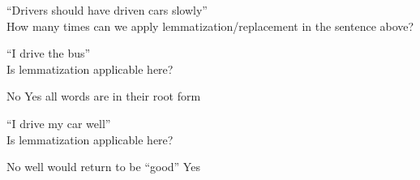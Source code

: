 \documentclass[theme=sleek, randomorder, hidesidemenu]{webquiz}
\begin{document}
\begin{question}
  ``Drivers should have driven cars slowly''\\
  How many times can we apply lemmatization/replacement in the sentence above?\\
\end{question}

\begin{question}
  ``I drive the bus''\\
  Is lemmatization applicable here?
  \begin{choice}
    \correct No
    \incorrect Yes \feedback all words are in their root form
  \end{choice}
\end{question}

\begin{question}
  ``I drive my car well''\\
  Is lemmatization applicable here?
  \begin{choice}
    \incorrect No \feedback well would return to be ``good''
    \correct Yes
  \end{choice}
\end{question}
\end{document}
